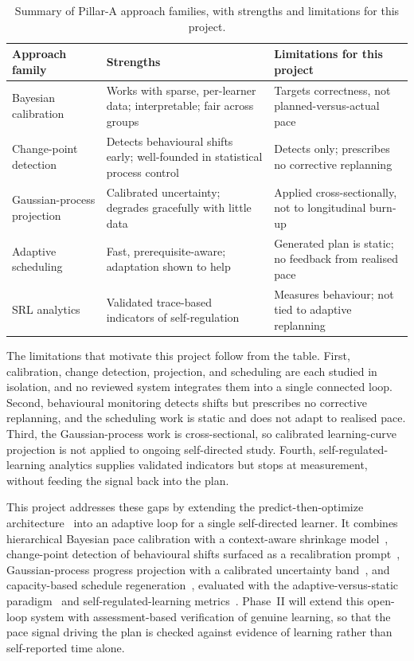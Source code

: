 \begin{table}[htbp]
\centering
\footnotesize
\caption{Summary of Pillar-A approach families, with strengths and limitations for this project.}
\label{tab:litsummary}
\begin{tabular}{p{3.0cm} p{4.2cm} p{4.2cm}}
\toprule
\textbf{Approach family} & \textbf{Strengths} & \textbf{Limitations for this project} \\
\midrule
Bayesian calibration~\cite{chen2024,zanellati2024,zambrano2024,mai2025} & Works with sparse, per-learner data; interpretable; fair across groups & Targets correctness, not planned-versus-actual pace \\
Change-point detection~\cite{saqr2026,qiao2026,boca2024,cheng2024} & Detects behavioural shifts early; well-founded in statistical process control & Detects only; prescribes no corrective replanning \\
Gaussian-process projection~\cite{perezsuay2024,chenyao2025,lin2024,huang2025,kayande2025} & Calibrated uncertainty; degrades gracefully with little data & Applied cross-sectionally, not to longitudinal burn-up \\
Adaptive scheduling~\cite{islam2024,fabregar2025,pagano2026,liu2025} & Fast, prerequisite-aware; adaptation shown to help & Generated plan is static; no feedback from realised pace \\
SRL analytics~\cite{alhazbi2024,debarba2025,uzun2025,butt2025} & Validated trace-based indicators of self-regulation & Measures behaviour; not tied to adaptive replanning \\
\bottomrule
\end{tabular}
\end{table}

The limitations that motivate this project follow from the table. First, calibration, change detection, projection, and scheduling are each studied in isolation, and no reviewed system integrates them into a single connected loop. Second, behavioural monitoring detects shifts but prescribes no corrective replanning, and the scheduling work is static and does not adapt to realised pace. Third, the Gaussian-process work is cross-sectional, so calibrated learning-curve projection is not applied to ongoing self-directed study. Fourth, self-regulated-learning analytics supplies validated indicators but stops at measurement, without feeding the signal back into the plan.

This project addresses these gaps by extending the predict-then-optimize architecture~\cite{islam2024} into an adaptive loop for a single self-directed learner. It combines hierarchical Bayesian pace calibration with a context-aware shrinkage model~\cite{chen2024}, change-point detection of behavioural shifts surfaced as a recalibration prompt~\cite{saqr2026,qiao2026}, Gaussian-process progress projection with a calibrated uncertainty band~\cite{perezsuay2024}, and capacity-based schedule regeneration~\cite{fabregar2025}, evaluated with the adaptive-versus-static paradigm~\cite{pagano2026} and self-regulated-learning metrics~\cite{alhazbi2024}. Phase~II will extend this open-loop system with assessment-based verification of genuine learning, so that the pace signal driving the plan is checked against evidence of learning rather than self-reported time alone.
